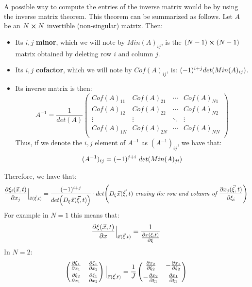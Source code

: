 \documentclass[11pt, a4paper]{article} %
\begin{document}
A possible way to compute the entries of the inverse matrix would be by using the inverse matrix theorem. This theorem can be summarized as follows. Let $A$ be an $N\cross N$ invertible (non-singular) matrix. Then:
\begin{itemize}
\item Its $i,j$ {\bf minor}, which we will note by $Min(A)_{ij}$, is the $(N-1)\cross (N-1)$ matrix obtained by deleting row $i$ and column $j$.
\item Its $i,j$ {\bf cofactor}, which we will note by $Cof(A)_{ij}$, is: $(-1)^{i+j}det\qty(Min(A)_{ij})$.
\item Its inverse matrix is then:
\begin{equation}
A^{-1}=\frac{1}{det(A)} \begin{pmatrix}
Cof(A)_{11} & Cof(A)_{21}&\cdots& Cof(A)_{N1}\\
Cof(A)_{12} & Cof(A)_{22}&\cdots& Cof(A)_{N2}\\
\vdots & \vdots & \ddots & \vdots \\
Cof(A)_{1N} & Cof(A)_{2N}&\cdots& Cof(A)_{NN}\\
\end{pmatrix}
\end{equation}
Thus, if we denote the $i,j$ element of $A^{-1}$ as $(A^{-1})_{ij}$, we have that:
\begin{equation}
(A^{-1})_{ij} = (-1)^{j+i}\ det\qty(Min(A)_{ji} )
\end{equation}
\end{itemize}
Therefore, we have that:
\begin{equation}\label{JacobChange}
\pdv{\xi_i(\vec{x},t)}{x_j}\Big\rvert_{\vec{x}(\vec{\xi},t)} = \frac{ (-1)^{i+j}}{det \qty(D_{\xi} \vec{x}(\vec{\xi},t))}\cdot det \qty(D_{\xi} \vec{x}(\vec{\xi},t)\textit{ erasing the row and column of }\pdv{x_j(\vec{\xi},t)}{\xi_i} )
\end{equation}
For example in $N=1$ this means that:
\begin{equation}
\pdv{\xi(\vec{x},t)}{x}\Big\rvert_{\vec{x}(\vec{\xi},t)}=\frac{1}{\pdv{x(\xi,t)}{\xi}}
\end{equation}
In $N=2$:
\begin{equation}
\begin{pmatrix}
\pdv{\xi_1}{x_1} & \pdv{\xi_1}{x_2} \vspace{0.15cm}\\
\pdv{\xi_2}{x_1} & \pdv{\xi_1}{x_2}
\end{pmatrix}\Big\rvert_{\vec{x}(\vec{\xi},t)}= \frac{1}{J} \begin{pmatrix}
\pdv{x_2}{\xi_2} & - \pdv{x_1}{\xi_2} \vspace{0.15cm}\\
-\pdv{x_2}{\xi_1} & \pdv{x_1}{\xi_1
} 
\end{pmatrix}
\end{equation}
\end{document}
